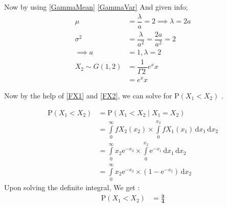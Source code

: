 \documentclass[twocolumn]{article}
\providecommand{\brak}[1]{\ensuremath{\left(#1\right)}}
\begin{document}
Now by using \eqref{GammaMean} \eqref{GammaVar} And given info; \\
\begin{align}
\mu &= \dfrac{\lambda}{a}=2 
\implies \lambda = 2a \\
\sigma^2 &=  \dfrac{\lambda}{a^2}=\dfrac{2a}{a^2}=2  \\ \implies a &= 1,\lambda=2 \\
X_2\sim G(1,2) &= \dfrac{1}{\Gamma{2}\ } e^{x}x \\
 &= e^{x}x \label{FX2}
\end{align}


Now by the help of \eqref{FX1} and \eqref{FX2}, we can solve for $\mathrm{P} \brak{X_1 < X_2} $ .

\begin{align}
  \mathrm{P}(X_1<X_2) &= \mathrm{P}\brak{X_1 < X_2 \mid X_1 = X_2} \\
  &= \int \limits_{0}^{\infty} fX_2 \brak{x_2} \times \int \limits_{0}^{x_2} fX_1 \brak{x_1} \, \mathrm{d}x_1 \, \mathrm{d}x_2 \\
  &= \int \limits_{0}^{\infty} x_2 \mathrm{e}^{-x_2} \times \int \limits_{0}^{x_2} \mathrm{e}^{-x_1} \, \mathrm{d}x_1 \, \mathrm{d}x_2 \\
  &= \int \limits_{0}^{\infty} x_2 \mathrm{e}^{-x_2} \times \brak{1-\mathrm{e}^{-x_2} } \, \mathrm{d}x_2 
\end{align}
Upon solving the definite integral, We get :
\begin{align}
   \mathrm{P}(X_1<X_2) &= \mathbf{ \frac{3}{4} } 
\end{align}
\end{document}
